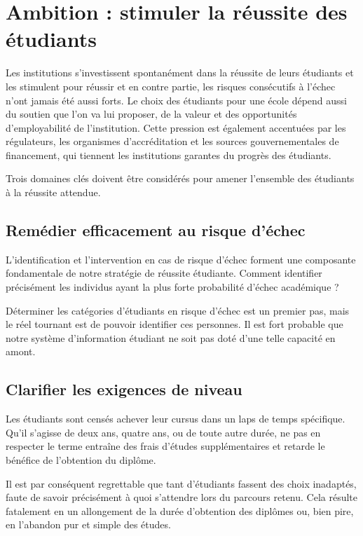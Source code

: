 \section{Ambition : stimuler la réussite des étudiants}
Les institutions s'investissent spontanément dans la réussite de leurs étudiants et les stimulent pour réussir et en contre partie, les risques consécutifs à l'échec n'ont jamais été aussi forts. Le choix des étudiants pour une école dépend aussi du soutien que l'on va lui proposer, de la valeur et des opportunités d'employabilité de l'institution. Cette pression est également accentuées par les régulateurs, les organismes d'accréditation et les sources gouvernementales de financement, qui tiennent les institutions garantes du progrès des étudiants.
\medskip

Trois domaines clés doivent être considérés pour amener l'ensemble des étudiants à la réussite attendue.

\subsection{Remédier efficacement au risque d'échec}
L'identification et l'intervention en cas de risque d'échec forment une composante fondamentale de notre stratégie de réussite étudiante. Comment identifier précisément les individus ayant la plus forte probabilité d'échec académique ?
\medskip

Déterminer les catégories d'étudiants en risque d'échec est un premier pas, mais le réel tournant est de pouvoir identifier ces personnes. Il est fort probable que notre système d'information étudiant ne soit pas doté d'une telle capacité en amont.

\subsection{Clarifier les exigences de niveau}
Les étudiants sont censés achever leur cursus dans un laps de temps spécifique. Qu'il s'agisse de deux ans, quatre ans, ou de toute autre durée, ne pas en respecter le terme entraîne des frais d'études supplémentaires et retarde le bénéfice de l'obtention du diplôme.
\medskip

Il est par conséquent regrettable que tant d'étudiants fassent des choix inadaptés, faute de savoir précisément à quoi s'attendre lors du parcours retenu. Cela résulte fatalement en un allongement de la durée d'obtention des diplômes ou, bien pire, en l'abandon pur et simple des études.

